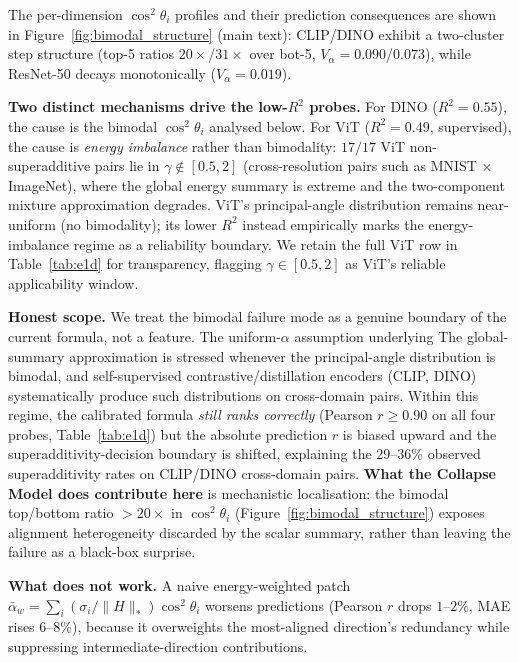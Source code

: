 \documentclass{article}
\begin{document}
The per-dimension $\cos^2\theta_i$ profiles and their prediction
consequences are shown in Figure~\ref{fig:bimodal_structure} (main text):
CLIP/DINO exhibit a two-cluster step structure (top-5 ratios
$20{\times}$/$31{\times}$ over bot-5, $V_\alpha{=}0.090$/$0.073$),
while ResNet-50 decays monotonically ($V_\alpha{=}0.019$).

\textbf{Two distinct mechanisms drive the low-$R^2$ probes.}
For DINO ($R^2{=}0.55$), the cause is the bimodal $\cos^2\theta_i$
analysed below. For ViT ($R^2{=}0.49$, supervised), the cause is
\emph{energy imbalance} rather than bimodality: $17/17$ ViT
non-superadditive pairs lie in $\gamma{\notin}[0.5,2]$ (cross-resolution
pairs such as MNIST $\times$ ImageNet), where the global energy summary is
extreme and the two-component mixture approximation degrades.
ViT's principal-angle distribution remains near-uniform (no bimodality);
its lower $R^2$ instead empirically marks the energy-imbalance regime as
a reliability boundary.
We retain the full ViT row in Table~\ref{tab:e1d} for transparency,
flagging $\gamma{\in}[0.5,2]$ as ViT's reliable applicability window.

\textbf{Honest scope.}
We treat the bimodal failure mode as a genuine boundary of the current
formula, not a feature.
The uniform-$\alpha$ assumption underlying
The global-summary approximation is stressed whenever the principal-angle
distribution is bimodal, and self-supervised contrastive/distillation
encoders (CLIP, DINO) systematically produce such distributions on
cross-domain pairs.
Within this regime, the calibrated formula \emph{still ranks correctly}
(Pearson $r{\geq}0.90$ on all four probes, Table~\ref{tab:e1d})
but the absolute prediction $\hat r$ is biased upward and the
superadditivity-decision boundary is shifted, explaining the
$29$--$36\%$ observed superadditivity rates on CLIP/DINO cross-domain
pairs.
\textbf{What the Collapse Model does contribute here} is mechanistic
localisation: the bimodal top/bottom ratio ${>}20{\times}$ in
$\cos^2\theta_i$ (Figure~\ref{fig:bimodal_structure}) exposes alignment
heterogeneity discarded by the scalar summary, rather than leaving the
failure as a black-box surprise.

\textbf{What does not work.}
A naive energy-weighted patch
$\bar\alpha_w{=}\sum_i(\sigma_i/\|H\|_*)\cos^2\theta_i$
worsens predictions (Pearson $r$ drops $1$--$2\%$, MAE rises
$6$--$8\%$), because it overweights the most-aligned direction's
redundancy while suppressing intermediate-direction contributions.
\end{document}
